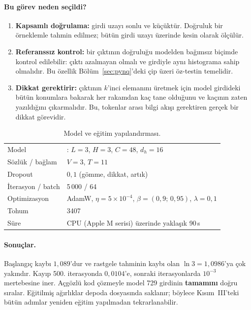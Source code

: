 \paragraph{Bu görev neden seçildi?}
\begin{enumerate}
  \item \textbf{Kapsamlı doğrulama:} girdi uzayı sonlu ve küçüktür. Doğruluk bir örneklemle tahmin edilmez; bütün girdi uzayı üzerinde kesin olarak ölçülür.
  \item \textbf{Referanssız kontrol:} bir çıktının doğruluğu modelden bağımsız biçimde kontrol edilebilir: çıktı azalmayan olmalı ve girdiyle aynı histograma sahip olmalıdır. Bu özellik Bölüm~\ref{sec:pynq}'deki çip üzeri öz-testin temelidir.
  \item \textbf{Dikkat gerektirir:} çıktının $k$'inci elemanını üretmek için model girdideki bütün konumlara bakarak her rakamdan kaç tane olduğunu ve kaçının zaten yazıldığını çıkarmalıdır. Bu, tokenlar arası bilgi akışı gerektiren gerçek bir dikkat görevidir.
\end{enumerate}

\begin{table}[h]
  \centering\small
  \caption{Model ve eğitim yapılandırması.}
  \label{tab:egitim}
  \begin{tabularx}{0.8\textwidth}{@{}lL@{}}
    \toprule
     &  \\ \midrule
    Model & : $L=3$, $H=3$, $C=48$, $d_h=16$ \\
    Sözlük / bağlam & $V=3$, $T=11$ \\
    Dropout & $0{,}1$ (gömme, dikkat, artık) \\
    İterasyon / batch & 5\,000 / 64 \\
    Optimizasyon & AdamW, $\eta = 5\times10^{-4}$, $\beta=(0{,}9;\,0{,}95)$, $\lambda=0{,}1$ \\
    Tohum & 3407 \\
    Süre & CPU (Apple M serisi) üzerinde yaklaşık 90\,s \\ \bottomrule
  \end{tabularx}
\end{table}

\paragraph{Sonuçlar.} Başlangıç kaybı $1{,}089$'dur ve rastgele tahminin kaybı olan $\ln 3 = 1{,}0986$'ya çok yakındır. Kayıp 500. iterasyonda $0{,}0104$'e, sonraki iterasyonlarda $10^{-3}$ mertebesine iner. Açgözlü kod çözmeyle model 729 girdinin \textbf{tamamını} doğru sıralar. Eğitilmiş ağırlıklar depoda  dosyasında saklanır; böylece Kısım~III'teki bütün adımlar yeniden eğitim yapılmadan tekrarlanabilir.

